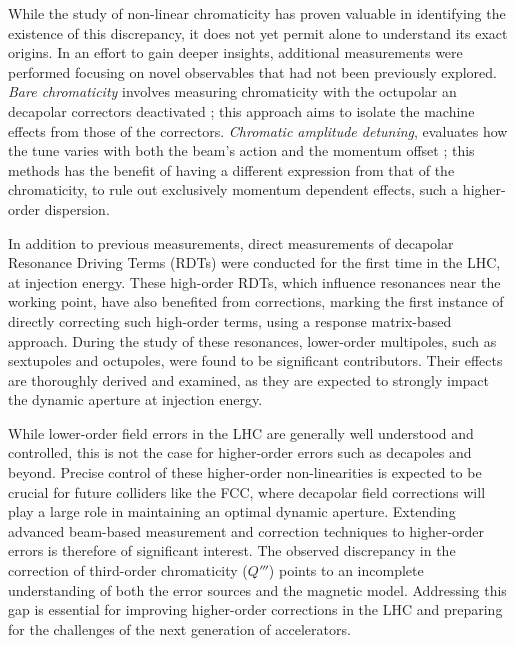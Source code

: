 While the study of non-linear chromaticity has proven valuable in identifying the existence of this
discrepancy, it does not yet permit alone to understand its exact origins. In an effort to gain
deeper insights, additional measurements were performed focusing on novel observables that had not
been previously explored.
\textit{Bare chromaticity} involves measuring chromaticity with
the octupolar an decapolar correctors deactivated ; this approach aims to isolate the machine
effects from those of the correctors.
\textit{Chromatic amplitude detuning}, evaluates how the tune varies with both the beam's action and
the momentum offset ; this methods has the benefit of having a different expression from that of the
chromaticity, to rule out exclusively momentum dependent effects, such a higher-order dispersion.

In addition to previous measurements, direct measurements of decapolar Resonance Driving Terms
(RDTs) were conducted for the first time in the LHC, at injection energy. These high-order RDTs,
which influence resonances near the working point, have also benefited from corrections, marking the
first instance of directly correcting such high-order terms, using a response matrix-based approach.
During the study of these resonances, lower-order multipoles, such as sextupoles and octupoles, were
found to be significant contributors. Their effects are thoroughly derived and examined, as they are
expected to strongly impact the dynamic aperture at injection energy.

While lower-order field errors in the LHC are generally well understood and controlled, this is not
the case for higher-order errors such as decapoles and beyond. Precise control of these higher-order
non-linearities is expected to be crucial for future colliders like the FCC, where decapolar field
corrections will play a large role in maintaining an optimal dynamic aperture. Extending advanced
beam-based measurement and correction techniques to higher-order errors is therefore of significant
interest.
The observed discrepancy in the correction of third-order chromaticity ($Q'''$) points to an
incomplete understanding of both the error sources and the magnetic model. Addressing this gap is
essential for improving higher-order corrections in the LHC and preparing for the challenges of the
next generation of accelerators.
